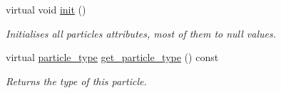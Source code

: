 \begin{DoxyCompactItemize}
virtual void \hyperlink{classphysim_1_1particles_1_1free__particle_a0df21e64a28c5fdf471d54a50b59fea3}{init} ()
\begin{DoxyCompactList}\small\item\em Initialises all particle\textquotesingle{}s attributes, most of them to null values. \end{DoxyCompactList}\item 
\mbox{\label{classphysim_1_1particles_1_1free__particle_a3400dd6813c8501646d10ca592f0d67d}} 
virtual \hyperlink{namespacephysim_1_1particles_a068e6cda6626fbd381c07a9835425b08}{particle\+\_\+type} \hyperlink{classphysim_1_1particles_1_1free__particle_a3400dd6813c8501646d10ca592f0d67d}{get\+\_\+particle\+\_\+type} () const
\begin{DoxyCompactList}\small\item\em Returns the type of this particle. \end{DoxyCompactList}\end{DoxyCompactItemize}
